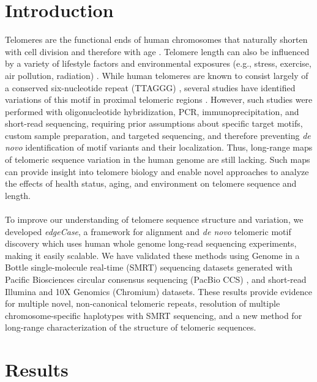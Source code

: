 \documentclass{article}
\begin{document}
\section*{Introduction} 
Telomeres are the functional ends of human chromosomes that naturally shorten with cell division and therefore with age \cite{teloaging}.
Telomere length can also be influenced by a variety of lifestyle factors and environmental exposures (e.g., stress, exercise, air pollution, radiation) \cite{teloeffects}.
While human telomeres are known to consist largely of a conserved six-nucleotide repeat (TTAGGG) \cite{moyzis}, several studies have identified variations of this motif in proximal telomeric regions \cite{telovars1989,telovars1999,telovars2018,telovars2019}.
However, such studies were performed with oligonucleotide hybridization, PCR, immunoprecipitation, and short-read sequencing, requiring prior assumptions about specific target motifs, custom sample preparation, and targeted sequencing, and therefore preventing \textit{de novo} identification of motif variants and their localization.
Thus, long-range maps of telomeric sequence variation in the human genome are still lacking.
Such maps can provide insight into telomere biology and enable novel approaches to analyze the effects of health status, aging, and environment on telomere sequence and length.
\\~\\
To improve our understanding of telomere sequence structure and variation, we developed \textit{edgeCase}, a framework for alignment and \textit{de novo} telomeric motif discovery which uses human whole genome long-read sequencing experiments, making it easily scalable.
We have validated these methods using Genome in a Bottle \cite{giab} single-molecule real-time (SMRT) sequencing datasets generated with Pacific Biosciences circular consensus sequencing (PacBio CCS) \cite{pacbio,pacbioccs}, and short-read Illumina \cite{illumina} and 10X Genomics (Chromium) \cite{10x} datasets.
These results provide evidence for multiple novel, non-canonical telomeric repeats, resolution of multiple chromosome-specific haplotypes with SMRT sequencing, and a new method for long-range characterization of the structure of telomeric sequences.

\section*{Results} 
\end{document}
